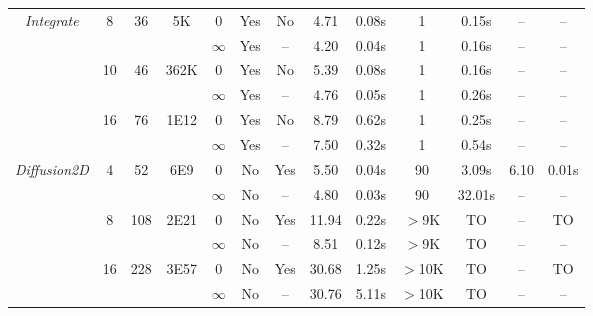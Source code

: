 \begin{savenotes}
\begin{table*}[t]
\begin{center}
\begin{threeparttable}
\begin{tabular}{|c|c|c|c|c|c|c|c|c|c|c|c|c|}
	   \multirow{6}{*}{\textit{Integrate}} & \multirow{2}{*}{8} & \multirow{2}{*}{36} &  \multirow{2}{*}{5K} 
          												     & 0 & Yes & No & 4.71 & 0.08s & 1 & 0.15s & --  & -- \tnote{a}\\ \cline{5-13}
          						       &                            & &  &  $\infty$ & Yes & -- & 4.20 & 0.04s & 1 & 0.16s &  -- & --\\ \cline{2-13}
						       		& \multirow{2}{*}{10} & \multirow{2}{*}{46} &  \multirow{2}{*}{362K} 
          												     & 0 & Yes & No & 5.39 & 0.08s & 1 & 0.16s & -- & -- \tnote{a}\\ \cline{5-13}
          						       &                            & &  &  $\infty$ & Yes & -- & 4.76 & 0.05s & 1 & 0.26s &  -- & --\\ \cline{2-13}
						              & \multirow{2}{*}{16} & \multirow{2}{*}{76} &  \multirow{2}{*}{1E12} 
          												     & 0 & Yes & No & 8.79 & 0.62s & 1 & 0.25s & -- & -- \tnote{a}\\ \cline{5-13}
          						       &                            & &  &  $\infty$ & Yes & -- & 7.50 & 0.32s & 1 & 0.54s & --  & --\\ \hline
						       \hline
						       
	    \multirow{6}{*}{\textit{Diffusion2D}} & \multirow{2}{*}{4} & \multirow{2}{*}{52} &  \multirow{2}{*}{6E9} 
          												     & 0 & No & Yes & 5.50 & 0.04s & 90 & 3.09s & 6.10 & 0.01s\\ \cline{5-13}
          						       &                            & &  &  $\infty$ & No & -- & 4.80 & 0.03s & 90 & 32.01s &  -- & --\\ \cline{2-13}
						       		& \multirow{2}{*}{8} & \multirow{2}{*}{108} &  \multirow{2}{*}{2E21} 
          												     & 0 & No & Yes & 11.94 & 0.22s & $>$9K & TO & -- & TO\\ \cline{5-13}
          						       &                            & &  &  $\infty$ & No & -- & 8.51 & 0.12s & $>$9K & TO &  -- & --\\ \cline{2-13}
						              & \multirow{2}{*}{16} & \multirow{2}{*}{228} &  \multirow{2}{*}{3E57} 
          												     & 0 & No & Yes & 30.68 & 1.25s & $>$10K & TO & -- & TO\\ \cline{5-13}
          						       &                            & &  &  $\infty$ & No & -- & 30.76 & 5.11s & $>$10K & TO & --  & --\\ \hline
						       \hline
						       

\end{tabular}
\end{threeparttable}
\end{center}
\end{table*}
\end{savenotes}
